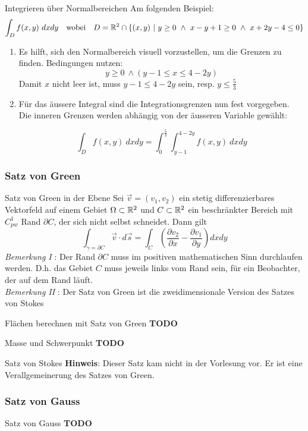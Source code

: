 \begin{Rezept}{Integrieren über Normalbereichen}{}
Am folgenden Beispiel:
\[ \int_D f(x, y) ~ dx dy ~~ \text{ wobei } ~~ D = \mathbb{R}^2 \cap \{(x, y) ~ | ~ y \geq 0 ~ \wedge ~ x-y+1\geq 0 ~ \wedge ~ x+2y-4 \leq 0\}\]
\begin{enumerate}
\item {
Es hilft, sich den Normalbereich visuell vorzustellen, um die Grenzen
zu finden. Bedingungen nutzen:
\[ y \geq 0 ~ \wedge (y-1 \leq x \leq 4-2y) \]
Damit $x$ nicht leer ist, muss $y-1 \leq 4-2y$ sein, resp. $y \leq \frac{5}{3}$ 
}
\item {
Für das äussere Integral sind die Integrationsgrenzen nun fest vorgegeben. Die inneren Grenzen
werden abhängig von der äusseren Variable gewählt:

\[ \int_D f(x,y) ~ dx dy = \int_0^{\frac{5}{3}} \int_{y-1}^{4-2y} f(x,y) ~ dx dy \]

}
\end{enumerate}
\end{Rezept}

\subsubsection{Satz von Green}

\begin{Satz}{Satz von Green in der Ebene}{}
	Sei $\vec{v} = (v_1, v_2)$ ein stetig differenzierbares Vektorfeld auf einem Gebiet $\Omega \subset \mathbb{R}^2$ und $C \subset \mathbb{R}^2$ ein beschränkter Bereich mit $C^1_{pw}$ Rand $\partial C$, der sich nicht selbst schneidet. Dann gilt
	\[
		\int_{\gamma=\partial C} \vec{v} \cdot d\vec{s} = 
		\int_C \left(\frac{\partial v_2}{\partial x} - \frac{\partial v_1}{\partial y}\right) dxdy
	\]
	\textit{Bemerkung I} : Der Rand $\partial C$ muss im positiven mathematischen Sinn durchlaufen werden. D.h. das Gebiet $C$ muss jeweils links vom Rand sein, für ein Beobachter, der auf dem Rand läuft.\\
	
	\textit{Bemerkung II} : Der Satz von Green ist die zweidimensionale Version des Satzes von Stokes
\end{Satz}

\begin{Rezept}{Flächen berechnen mit Satz von Green}{}
	\textbf{TODO}	
\end{Rezept}

\begin{Satz}{Masse und Schwerpunkt}{}
	\textbf{TODO}	
\end{Satz}

\begin{Satz}{Satz von Stokes}{}
	\textbf{Hinweis}: Dieser Satz kam nicht in der Vorlesung vor. Er ist eine Verallgemeinerung des Satzes von Green.	
\end{Satz}

\subsubsection{Satz von Gauss}

\begin{Satz}{Satz von Gauss}{}
	\textbf{TODO}	
\end{Satz}


